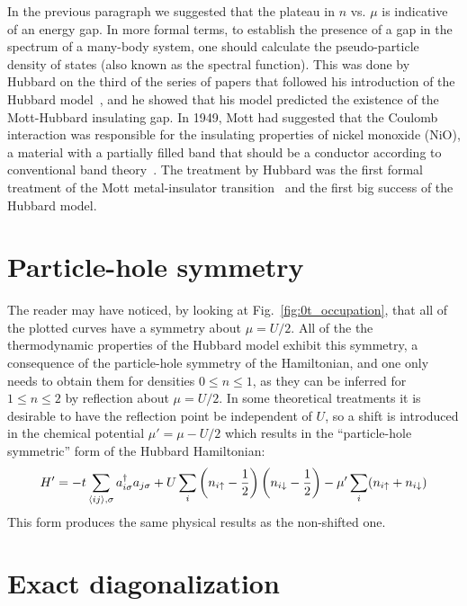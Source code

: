 In the previous paragraph we suggested that the plateau in $n$ vs. $\mu$ is
indicative of an energy gap.  In more formal terms, to establish the presence
of a gap in the spectrum of a many-body system, one should calculate the
pseudo-particle density of states (also known as the spectral function).  This
was done by Hubbard on the third of the series of papers that followed his
introduction of the Hubbard model~\cite{Hubbard1964}, and he showed that his
model predicted the  existence of the Mott-Hubbard insulating gap.  In 1949,
Mott had suggested that the Coulomb interaction was responsible for the
insulating properties of nickel monoxide (NiO), a material with a partially
filled band that should be a conductor according to conventional band
theory~\cite{Mott1949}.  The treatment by Hubbard was the first formal
treatment of the Mott metal-insulator transition~\cite{RevModPhys.40.677} and
the first big success of the Hubbard model.


\section{Particle-hole symmetry} 

The reader may have noticed, by looking at Fig.~\ref{fig:0t_occupation}, that
all of the plotted curves have a symmetry about $\mu=U/2$.    All of the the
thermodynamic properties of the Hubbard model exhibit this symmetry, a
consequence of the particle-hole symmetry of the Hamiltonian,  and one only
needs to obtain them for densities $0\leq n \leq 1$, as they can be inferred
for $1\leq n \leq 2$ by reflection about $\mu=U/2$.  In some theoretical
treatments it is desirable to have the reflection point be independent of $U$,
so a shift is introduced in the chemical potential $\mu' = \mu-U/2$ which
results in the ``particle-hole symmetric'' form of the Hubbard Hamiltonian:
\begin{equation}
  H' =  
-t \sum_{ \langle ij \rangle, \sigma   } 
          a_{i\sigma}^{\dagger}a_{j\sigma} 
         + U\sum_{i} \left( n_{i \uparrow } -\frac{1}{2}\right) 
                     \left( n_{i \downarrow} -\frac{1}{2}\right) 
   - \mu' \sum_{i}  ( n_{i \uparrow } + n_{i \downarrow} ) 
\end{equation}
This form produces the same physical results as the non-shifted one. 
 

\section{Exact diagonalization} 

